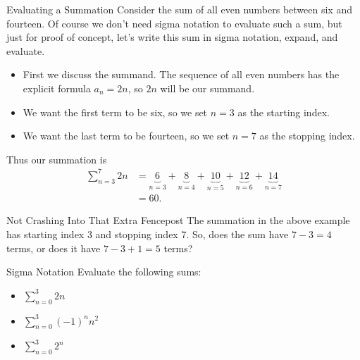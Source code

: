 \begin{example}{Evaluating a Summation}
Consider the sum of all even numbers between six and fourteen.  Of course we don't need sigma notation to evaluate such a sum, but just for proof of  concept, let's write this sum in sigma notation, expand, and evaluate. 
\begin{itemize}
\item First we discuss the summand.  The sequence of all even numbers has the explicit formula $a_n=2n$, so $2n$ will be our summand.
\item We want the first term to be six, so we set $n=3$ as the starting index. 
\item We want the last term to be fourteen, so we set $n=7$ as the stopping index.

\end{itemize}

Thus our summation is 
\begin{align*}
\sum_{n=3}^{7}2n &= \underset{n=3}{\underbrace{6}}+\underset{n=4}{\underbrace{8}}+\underset{n=5}{\underbrace{10}}+\underset{n=6}{\underbrace{12}}+\underset{n=7}{\underbrace{14}} \\
 &= 60.
\end{align*}

\end{example}

\begin{exercise}{Not Crashing Into That Extra Fencepost \Coffeecup}
The summation in the above example has starting index 3 and stopping index 7.  So, does the sum have $7-3=4$ terms, or does it have $7-3+1=5$ terms?
\end{exercise}


\begin{exercise}{Sigma Notation \Coffeecup}
Evaluate the following sums:
\begin{itemize}
\item $\sum\limits_{n=0}^{3} 2n $
\item $\sum\limits_{n=0}^{3} (-1)^nn^2 $
\item $\sum\limits_{n=0}^{3} 2^n $
\end{itemize}
\end{exercise}

